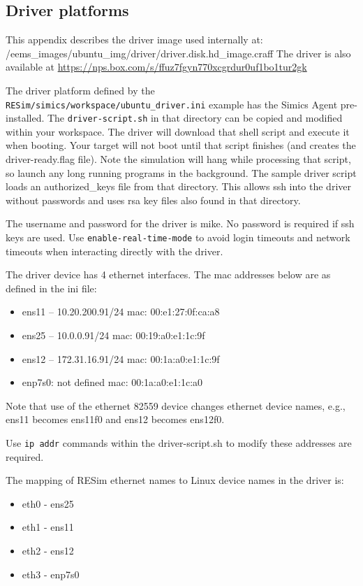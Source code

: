 \documentclass[titlepage]{article}
\begin{document}
\begin{appendices}
\section{Driver platforms}
\label{driver}
This appendix describes the driver image used internally at: /eems\_images/ubuntu\_img/driver/driver.disk.hd\_image.craff
The driver is also available at \url{https://nps.box.com/s/ffuz7fgyn770xcgrdur0uf1bo1tur2gk}

The driver platform defined by the {\tt RESim/simics/workspace/ubuntu\_driver.ini} example has the Simics Agent pre-installed.  The
{\tt driver-script.sh} in that directory can be copied and modified within your workspace.  The driver will download that shell script and execute
it when booting.  Your target will not boot until that script finishes (and creates the driver-ready.flag file).
Note the simulation will hang while processing that script, so launch any long running programs in the background.
The sample driver script loads an authorized\_keys file from that directory.  This allows ssh into the driver without passwords and uses
rsa key files also found in that directory.

The username and password for the driver is mike. No password is required if ssh keys are used.  Use {\tt enable-real-time-mode} to avoid login timeouts and network timeouts when
interacting directly with the driver.  

The driver device has 4 ethernet interfaces.  The mac addresses below are as defined in the ini file:
\begin{itemize}
\item ens11 -- 10.20.200.91/24  mac: 00:e1:27:0f:ca:a8
\item ens25 -- 10.0.0.91/24     mac: 00:19:a0:e1:1c:9f
\item ens12 -- 172.31.16.91/24  mac: 00:1a:a0:e1:1c:9f
\item enp7s0:  not defined      mac: 00:1a:a0:e1:1c:a0 
\end{itemize}
Note that use of the ethernet 82559 device changes ethernet device names, e.g., ens11 becomes ens11f0 and ens12 becomes ens12f0.

Use {\tt ip addr} commands within the driver-script.sh to modify these addresses are required.

The mapping of RESim ethernet names to Linux device names in the driver is: 

\begin{itemize}
\item eth0 - ens25
\item eth1 - ens11
\item eth2 - ens12
\item eth3 - enp7s0
\end{itemize}


\end{appendices}
\end{document}

